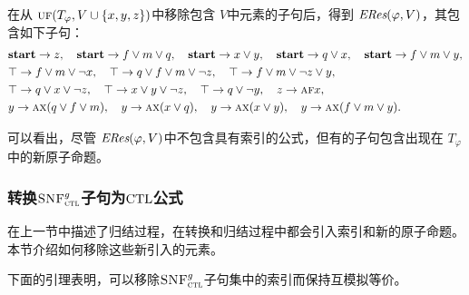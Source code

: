 \begin{example}
	在从 $\textsc{uf}(T_\varphi, V\cup \{x,y,z\})$中移除包含 $V$中元素的子句后，得到 $\emph{ERes}(\varphi,V)$，其包含如下子句：
	\begin{align*}%
		&\start\rto z, \quad \start \rto f\vee m \vee q, \quad  \start \rto x \vee y, \quad \start \rto q \vee x, \quad	\start \rto f\vee m \vee y, \\
		& \top \rto f \vee m \vee \neg x, \quad		\top \rto q \vee f \vee m\vee \neg z,
		\quad  	\top \rto f \vee m \vee \neg z \vee y,\\
		& \top \rto q \vee x\vee \neg z, \quad 	\top \rto x \vee y \vee \neg z, \quad 	\top \rto q\vee\neg y , \quad z \rto \ALL \FUTURE x, \\
		& y \rto \ALL\NEXT(q \vee f\vee m), \quad  y \rto \ALL\NEXT(x\vee q), \quad y \rto \ALL \NEXT(x\vee y),\quad 	y \rto \ALL\NEXT(f\vee m\vee y).
	\end{align*}
	
	可以看出，尽管 $\emph{ERes}(\varphi,V)$中不包含具有索引的公式，但有的子句包含出现在 $T_\varphi$中的新原子命题。
\end{example}


\subsubsection{转换${\textsc{SNF}_{\textsc{ctl}}^g}$子句为$\textrm{CTL}$公式}
\label{cha5:subsubsec:remIndex}
在上一节中描述了归结过程，在转换和归结过程中都会引入索引和新的原子命题。本节介绍如何移除这些新引入的元素。

下面的引理表明，可以移除${\textsc{SNF}_{\textsc{ctl}}^g}$子句集中的索引而保持互模拟等价。

